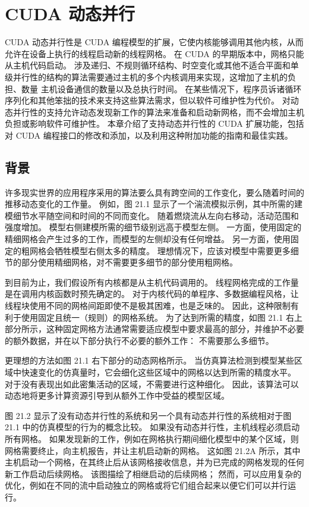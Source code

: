 \section{CUDA 动态并行}
CUDA 动态并行性是 CUDA 编程模型的扩展，它使内核能够调用其他内核，从而允许在设备上执行的线程启动新的线程网格。 在 CUDA 的早期版本中，网格只能从主机代码启动。 涉及递归、不规则循环结构、时空变化或其他不适合平面和单级并行性的结构的算法需要通过主机的多个内核调用来实现，这增加了主机的负担、数量 主机设备通信的数量以及总执行时间。 在某些情况下，程序员诉诸循环序列化和其他笨拙的技术来支持这些算法需求，但以软件可维护性为代价。 对动态并行性的支持允许动态发现新工作的算法来准备和启动新网格，而不会增加主机负担或影响软件可维护性。 本章介绍了支持动态并行性的 CUDA 扩展功能，包括对 CUDA 编程接口的修改和添加，以及利用这种附加功能的指南和最佳实践。

\subsection{背景}
许多现实世界的应用程序采用的算法要么具有跨空间的工作变化，要么随着时间的推移动态变化的工作量。 例如，图 21.1 显示了一个湍流模拟示例，其中所需的建模细节水平随空间和时间的不同而变化。 随着燃烧流从左向右移动，活动范围和强度增加。 模型右侧建模所需的细节级别远高于模型左侧。 一方面，使用固定的精细网格会产生过多的工作，而模型的左侧却没有任何增益。 另一方面，使用固定的粗网格会牺牲模型右侧太多的精度。 理想情况下，应该对模型中需要更多细节的部分使用精细网格，对不需要更多细节的部分使用粗网格。

到目前为止，我们假设所有内核都是从主机代码调用的。 线程网格完成的工作量是在调用内核函数时预先确定的。 对于内核代码的单程序、多数据编程风格，让线程块使用不同的网格间距即使不是极其困难，也是乏味的。 因此，这种限制有利于使用固定且统一（规则）的网格系统。 为了达到所需的精度，如图 21.1 右上部分所示，这种固定网格方法通常需要适应模型中要求最高的部分，并维护不必要的额外数据，并在以下部分执行不必要的额外工作： 不需要那么多细节。

更理想的方法如图 21.1 右下部分的动态网格所示。 当仿真算法检测到模型某些区域中快速变化的仿真量时，它会细化这些区域中的网格以达到所需的精度水平。 对于没有表现出如此密集活动的区域，不需要进行这种细化。 因此，该算法可以动态地将更多计算资源引导到从额外工作中受益的模型区域。

图 21.2 显示了没有动态并行性的系统和另一个具有动态并行性的系统相对于图 21.1 中的仿真模型的行为的概念比较。 如果没有动态并行性，主机线程必须启动所有网格。 如果发现新的工作，例如在网格执行期间细化模型中的某个区域，则网格需要终止，向主机报告，并让主机启动新的网格。 这如图 21.2A 所示，其中主机启动一个网格，在其终止后从该网格接收信息，并为已完成的网格发现的任何新工作启动后续网格。 该图描绘了相继启动的后续网格； 然而，可以应用复杂的优化，例如在不同的流中启动独立的网格或将它们组合起来以便它们可以并行运行。

